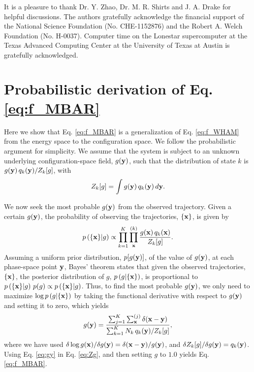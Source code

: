\documentclass[reprint,aip,jcp,superscriptaddress]{revtex4-1}
\begin{document}
It is a pleasure to thank
Dr. Y. Zhao, Dr. M. R. Shirts and J. A. Drake
for helpful discussions.
%
The authors gratefully acknowledge
the financial support of
the National Science Foundation (No. CHE-1152876)
and
the Robert A. Welch Foundation (No. H-0037).
%
Computer time on the Lonestar supercomputer
at the Texas Advanced Computing Center
at the University of Texas at Austin
is gratefully acknowledged.




\appendix





\section{\label{sec:deriveMBAR}
Probabilistic derivation of Eq. \eqref{eq:f_MBAR}}



Here we show that
Eq. \eqref{eq:f_MBAR}
is a generalization of Eq. \eqref{eq:f_WHAM}
from the energy space to the configuration space.
%
We follow the probabilistic argument\cite{
bartels1997, *gallicchio2005, *habeck2007, *habeck2012, zhu2012}
for simplicity.
%
We assume that the system is subject to
an unknown underlying configuration-space field, $g(\mathbf{y})$,
such that the distribution of state $k$ is
$g(\mathbf{y}) \, q_k(\mathbf{y}) / Z_k[g]$, with
%
\begin{equation}
Z_k[g]
=
\int g(\mathbf{y}) \, q_k(\mathbf{y}) \, d\mathbf{y}.
\label{eq:Zg}
\end{equation}



We now seek the most probable $g(\mathbf{y})$
from the observed trajectory.
%
Given a certain $g(\mathbf{y})$,
the probability of observing the trajectories,
$\{ \mathbf{x} \}$,
is given by
%
\begin{equation*}
p\left( \{ \mathbf{x} \} | g \right)
\propto
\prod_{k = 1}^K
\prod_{\mathbf{x}}^{(k)}
\frac{ g(\mathbf{x}) \, q_k(\mathbf{x}) }
     { Z_k[g] }.
\end{equation*}
%
Assuming a uniform prior distribution,
$p[g(\mathbf{y})]$, of the value of $g(\mathbf{y})$,
at each phase-space point $\mathbf{y}$,
Bayes' theorem\cite{leonard} states that
given the observed trajectories, $\{\mathbf{x}\}$,
the posterior distribution of $g$,
$p\left( g | \{ \mathbf{x} \} \right)$,
is proportional to
$p\left( \{ \mathbf{x} \} | g \right) \, p(g) \propto p\left( \{ \mathbf{x} \} | g \right)$.
%
Thus,
to find the most probable $g(\mathbf{y})$,
we only need to maximize
$\log p\left( g | \{ \mathbf{x} \} \right)$
by taking the functional derivative
with respect to $g(\mathbf{y})$
and setting it to zero,
which yields
%
\begin{equation}
g(\mathbf{y})
=
\frac{
  \sum_{j = 1}^K \sum_{\mathbf{x}}^{(j)} \delta(\mathbf{x} - \mathbf{y})
}
{
  \sum_{k = 1}^K N_k \, q_k(\mathbf{y}) / Z_k[g]
},
\label{eq:gy}
\end{equation}
%
where we have used
$\delta \log g(\mathbf{x}) / \delta g(\mathbf{y}) = \delta(\mathbf{x} - \mathbf{y})/g(\mathbf{y})$,
and
$\delta Z_k[g] / \delta g(\mathbf{y}) = q_k(\mathbf{y})$.
%
Using Eq. \eqref{eq:gy}
in Eq. \eqref{eq:Zg},
and then setting $g$ to $1.0$
yields Eq. \eqref{eq:f_MBAR}.
\end{document}
